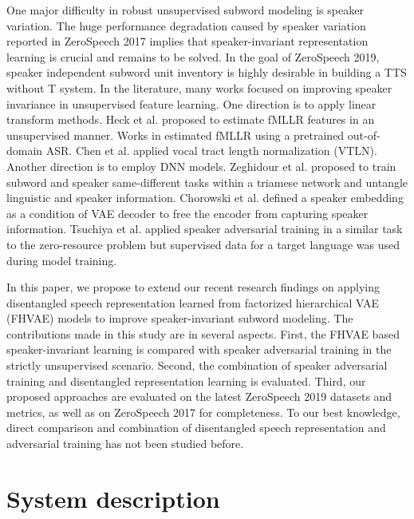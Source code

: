 \documentclass[a4paper]{article}
\begin{document}
One major difficulty  in robust unsupervised subword modeling is speaker variation. The huge  performance degradation caused by speaker variation reported in ZeroSpeech 2017 \cite{dunbar2017zero} implies that speaker-invariant  representation learning is crucial and remains to be solved. In the goal of ZeroSpeech 2019, speaker independent subword unit inventory  is  highly desirable in building a TTS without T system. In the literature, many works focused on improving speaker invariance in unsupervised feature learning. One direction is to apply  linear transform methods. Heck et al. \cite{heck2017feature} proposed to estimate fMLLR features in an unsupervised manner. Works in \cite{shibata2017composite,Feng2018exploiting} estimated fMLLR using a pretrained out-of-domain ASR. Chen et al. \cite{chen2017multilingual} applied vocal tract length normalization (VTLN).
Another direction is to employ DNN models. Zeghidour et al. \cite{Zeghidour+2016} proposed to train subword and speaker same-different tasks within a triamese network and untangle linguistic and speaker information. Chorowski et al. \cite{Chorowski2019unsup} defined a speaker embedding as a condition of VAE decoder to free the encoder from capturing speaker information. Tsuchiya et al. \cite{Tsuchiya2018speaker} applied speaker adversarial training in a similar task to the zero-resource problem but supervised data for a target language was used during model training.

In this paper, we propose to extend our recent research findings \cite{Feng2019improving} on applying disentangled speech representation learned from factorized hierarchical VAE (FHVAE) models \cite{hsu2017nips}  to improve speaker-invariant subword modeling. The contributions made in this study are in several aspects. First, the  FHVAE based speaker-invariant learning  is compared with  speaker adversarial training in the strictly unsupervised scenario. Second, the combination of speaker adversarial training and disentangled representation learning is evaluated.  Third, our proposed approaches are evaluated on the latest ZeroSpeech 2019 datasets and  metrics, as well as on ZeroSpeech 2017 for completeness.
To our best knowledge, direct comparison and combination  of disentangled speech representation and adversarial training has not been studied before.

\section{System description}
\end{document}
